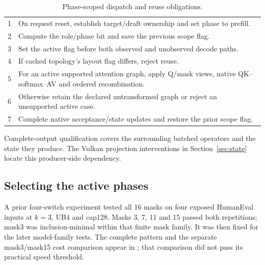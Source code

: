 \begin{table}[t]
\caption{Phase-scoped dispatch and reuse obligations.}
\label{alg:scope}
\begin{tabularx}{\columnwidth}{@{}rX@{}}\toprule
1 & On request reset, establish target/draft ownership and set phase to prefill.\\
2 & Compute the role/phase bit and save the previous scope flag.\\
3 & Set the active flag before both observed and unobserved decode paths.\\
4 & If cached topology's layout flag differs, reject reuse.\\
5 & For an active supported attention graph, apply Q/mask views, native QK--softmax--AV and ordered recombination.\\
6 & Otherwise retain the declared untransformed graph or reject an unsupported active case.\\
7 & Complete native acceptance/state updates and restore the prior scope flag.\\\bottomrule
\end{tabularx}
\end{table}

Complete-output qualification covers the surrounding batched operators and the state they produce. The Vulkan projection interventions in Section~\ref{sec:state} locate this producer-side dependency.

\subsection{Selecting the active phases}
A prior four-switch experiment tested all 16 masks on four exposed HumanEval inputs at $k=3$, UB4 and cap128. Masks 3, 7, 11 and 15 passed both repetitions; mask3 was inclusion-minimal within that finite mask family. It was then fixed for the later model-family tests. The complete pattern and the separate mask3/mask15 cost comparison appear in ; that comparison did not pass its practical speed threshold.
